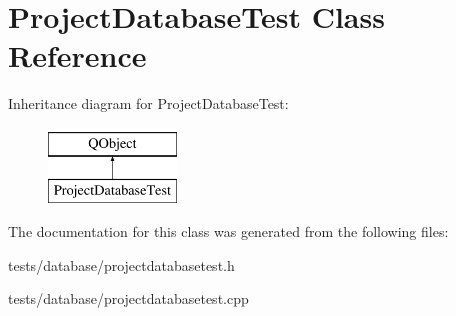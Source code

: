 \hypertarget{classProjectDatabaseTest}{}\section{Project\+Database\+Test Class Reference}
\label{classProjectDatabaseTest}
Inheritance diagram for Project\+Database\+Test\+:\begin{figure}[H]
\begin{center}
\leavevmode
\includegraphics[height=2.000000cm]{df/d3e/classProjectDatabaseTest}
\end{center}
\end{figure}


The documentation for this class was generated from the following files\+:\begin{DoxyCompactItemize}
\item 
tests/database/projectdatabasetest.\+h\item 
tests/database/projectdatabasetest.\+cpp\end{DoxyCompactItemize}

